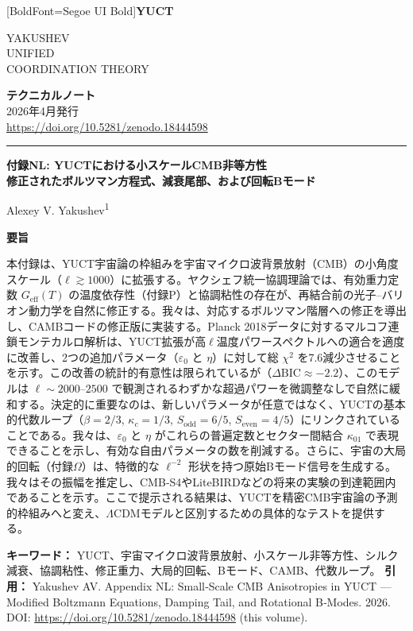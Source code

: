 \documentclass[11pt,a4paper]{article}
\newcommand{\makeheader}{%
	\noindent
	\begin{minipage}{0.17\textwidth}
		\raggedright
		{\fontspec{Segoe UI}[BoldFont=Segoe UI Bold]\bfseries\color{skyblue}\fontsize{46}{46}\selectfont YUCT}%
	\end{minipage}%
	\hspace{30pt}
	\begin{minipage}{0.32\textwidth}
		\raggedright
		{\sffamily\fontsize{11}{13}\selectfont YAKUSHEV\\ UNIFIED\\ COORDINATION THEORY}%
	\end{minipage}%
	\hfill
	\begin{minipage}{0.38\textwidth}
		\raggedleft
		{\sffamily\bfseries テクニカルノート}\\ 
		{\sffamily 2026年4月発行}\\ 
		{\sffamily\footnotesize \url{https://doi.org/10.5281/zenodo.18444598}}%
	\end{minipage}
	\par\vspace{5pt}
	\noindent\textcolor{gold}{\rule{\textwidth}{1.6pt}}
	\par\vspace{0pt}
}
\begin{document}
	\thispagestyle{firstpage}
	\makeheader
	
	\vspace{0cm}
	{\LARGE\bfseries 付録NL: YUCTにおける小スケールCMB非等方性 \\ 
		\Large 修正されたボルツマン方程式、減衰尾部、および回転Bモード \par}
	\vspace{0.2cm}
	
	{\large Alexey V. Yakushev\textsuperscript{1}} \\
	\vspace{0.0cm}
	
	{\color{darkblue}\textbf{\LARGE 要旨}} \par
	{\large
		\noindent
		本付録は、YUCT宇宙論の枠組みを宇宙マイクロ波背景放射（CMB）の小角度スケール（\(\ell \gtrsim 1000\)）に拡張する。ヤクシェフ統一協調理論では、有効重力定数 \(G_{\mathrm{eff}}(T)\) の温度依存性（付録P）と協調粘性の存在が、再結合前の光子–バリオン動力学を自然に修正する。我々は、対応するボルツマン階層への修正を導出し、CAMBコードの修正版に実装する。Planck 2018データに対するマルコフ連鎖モンテカルロ解析は、YUCT拡張が高\(\ell\)温度パワースペクトルへの適合を適度に改善し、2つの追加パラメータ（\(\varepsilon_0\) と \(\eta\)）に対して総 \(\chi^2\) を7.6減少させることを示す。この改善の統計的有意性は限られているが（\(\Delta\mathrm{BIC} \approx -2.2\)）、このモデルは \(\ell \sim 2000\)--\(2500\) で観測されるわずかな超過パワーを微調整なしで自然に緩和する。決定的に重要なのは、新しいパラメータが任意ではなく、YUCTの基本的代数ループ（\(\beta=2/3\), \(\kappa_c=1/3\), \(S_{\mathrm{odd}}=6/5\), \(S_{\mathrm{even}}=4/5\)）にリンクされていることである。我々は、\(\varepsilon_0\) と \(\eta\) がこれらの普遍定数とセクター間結合 \(\kappa_{01}\) で表現できることを示し、有効な自由パラメータの数を削減する。さらに、宇宙の大局的回転（付録\(\Omega\)）は、特徴的な \(\ell^{-2}\) 形状を持つ原始Bモード信号を生成する。我々はその振幅を推定し、CMB‑S4やLiteBIRDなどの将来の実験の到達範囲内であることを示す。ここで提示される結果は、YUCTを精密CMB宇宙論の予測的枠組みへと変え、\(\Lambda\)CDMモデルと区別するための具体的なテストを提供する。
	}
	
	\vspace{0.1cm}
	\noindent
	{\color{darkblue}\textbf{キーワード：}} YUCT、宇宙マイクロ波背景放射、小スケール非等方性、シルク減衰、協調粘性、修正重力、大局的回転、Bモード、CAMB、代数ループ。
	\vspace{0.1cm}
	\noindent
	{\color{darkblue}\textbf{引用：}} Yakushev AV. Appendix NL: Small‑Scale CMB Anisotropies in YUCT — Modified Boltzmann Equations, Damping Tail, and Rotational B‑Modes. 2026. DOI: \url{https://doi.org/10.5281/zenodo.18444598} (this volume).
	
\end{document}

